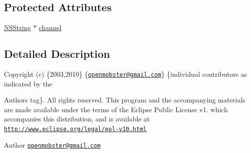 \subsection*{\-Protected \-Attributes}
\begin{DoxyCompactItemize}
\item 
\hyperlink{class_n_s_string}{\-N\-S\-String} $\ast$ \hyperlink{interface_abstract_sync_test_a4665b72180425740facd9b64d5906305}{channel}
\end{DoxyCompactItemize}


\subsection{\-Detailed \-Description}
\-Copyright (c) \{2003,2010\} \{\href{mailto:openmobster@gmail.com}{\tt openmobster@gmail.\-com}\} \{individual contributors as indicated by the \begin{DoxyAuthor}{\-Authors}
tag\}. \-All rights reserved. \-This program and the accompanying materials are made available under the terms of the \-Eclipse \-Public \-License v1. which accompanies this distribution, and is available at \href{http://www.eclipse.org/legal/epl-v10.html}{\tt http\-://www.\-eclipse.\-org/legal/epl-\/v10.\-html}
\end{DoxyAuthor}
\begin{DoxyAuthor}{\-Author}
\href{mailto:openmobster@gmail.com}{\tt openmobster@gmail.\-com} 
\end{DoxyAuthor}


